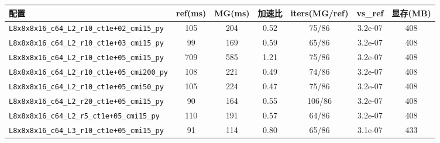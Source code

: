 \begin{tabular}{lcccccc}
\hline
配置 & ref(ms) & MG(ms) & 加速比 & iters(MG/ref) & vs\_ref & 显存(MB) \\
\hline
\texttt{L8x8x8x16\_c64\_L2\_r10\_ct1e+02\_cmi15\_py} & 105 & 204 & 0.52 & 75/86 & 3.2e-07 & 408 \\
\texttt{L8x8x8x16\_c64\_L2\_r10\_ct1e+03\_cmi15\_py} & 99 & 169 & 0.59 & 65/86 & 3.2e-07 & 408 \\
\texttt{L8x8x8x16\_c64\_L2\_r10\_ct1e+05\_cmi15\_py} & 709 & 585 & 1.21 & 75/86 & 3.2e-07 & 408 \\
\texttt{L8x8x8x16\_c64\_L2\_r10\_ct1e+05\_cmi200\_py} & 108 & 221 & 0.49 & 74/86 & 3.2e-07 & 408 \\
\texttt{L8x8x8x16\_c64\_L2\_r10\_ct1e+05\_cmi50\_py} & 105 & 224 & 0.47 & 75/86 & 3.2e-07 & 408 \\
\texttt{L8x8x8x16\_c64\_L2\_r20\_ct1e+05\_cmi15\_py} & 90 & 164 & 0.55 & 106/86 & 3.2e-07 & 408 \\
\texttt{L8x8x8x16\_c64\_L2\_r5\_ct1e+05\_cmi15\_py} & 110 & 191 & 0.57 & 64/86 & 3.2e-07 & 408 \\
\texttt{L8x8x8x16\_c64\_L3\_r10\_ct1e+05\_cmi15\_py} & 91 & 114 & 0.80 & 65/86 & 3.1e-07 & 433 \\
\hline
\end{tabular}
